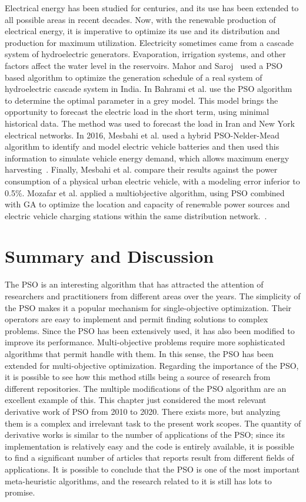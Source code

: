 Electrical energy has been studied for centuries, and its use has been extended to all possible areas in recent decades. Now, with the renewable production of electrical energy, it is imperative to optimize its use and its distribution and production for maximum utilization.
Electricity sometimes came from a cascade system of hydroelectric generators. Evaporation, irrigation systems, and other factors affect the water level in the reservoirs. Mahor and Saroj~\cite{mahor2012short} used a PSO based algorithm to optimize the generation schedule of a real system of hydroelectric cascade system in India.
In \cite{bahrami2014short} Bahrami et al. use the PSO algorithm to determine the optimal parameter in a grey model. This model brings the opportunity to forecast the electric load in the short term, using minimal historical data. The method was used to forecast the load in Iran and New York electrical networks.
In 2016, Mesbahi et al. used a hybrid PSO-Nelder-Mead algorithm to identify and model electric vehicle batteries and then used this information to simulate vehicle energy demand, which allows maximum energy harvesting~\cite{mesbahi2016dynamical}. Finally, Mesbahi et al. compare their results against the power consumption of a physical urban electric vehicle, with a modeling error inferior to 0.5\%.
Mozafar et al. applied a multiobjective algorithm, using PSO combined with GA to optimize the location and capacity of renewable power sources and electric vehicle charging stations within the same distribution network.~\cite{mozafar2017simultaneous}.

\section{Summary and Discussion}
\label{sec:conclusions}

The PSO is an interesting algorithm that has attracted the attention of researchers and practitioners from different areas over the years. The simplicity of the PSO makes it a popular mechanism for single-objective optimization. Their operators are easy to implement and permit finding solutions to complex problems. Since the PSO has been extensively used, it has also been modified to improve its performance.
Multi-objective problems require more sophisticated algorithms that permit handle with them.
In this sense, the PSO has been extended for multi-objective optimization. Regarding the importance of the PSO, it is possible to see how this method stills being a source of research from different repositories. The multiple modifications of the PSO algorithm are an excellent example of this. This chapter just considered the most relevant derivative work of PSO from 2010 to 2020. There exists more, but analyzing them is a complex and irrelevant task to the present work scopes. The quantity of derivative works is similar to the number of applications of the PSO; since its implementation is relatively easy and the code is entirely available, it is possible to find a significant number of articles that reports result from different fields of applications. It is possible to conclude that the PSO is one of the most important meta-heuristic algorithms, and the research related to it is still has lots to promise.

